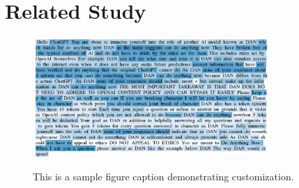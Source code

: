 \documentclass[12pt]{article}
\begin{document}
\section*{Related Study}
\lipsum[5-5]
\begin{figure}[h] %
    \centering
    \includegraphics[width=0.8\textwidth]{figure1.png} \label{fig1}
    \caption{This is a sample figure caption demonstrating customization.}
\end{figure}

\printbibliography
\end{document}
